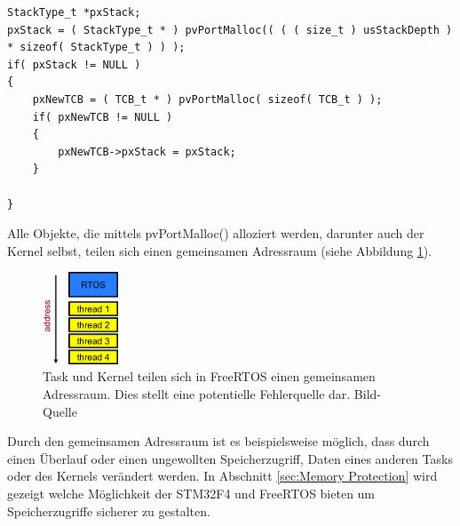 \begin{lstlisting}[caption={FreeRTOS Source von xTaskCreate() aus Task.c. Jeder Task besitzt einen Stack und einen Task Control Block, beide werden beim Aufruf von xTaskCreate (Zeile 2 und Zeile 6) erstellt.}, linewidth=8cm,captionpos=b, label=lst:xTaskCreate, float=htb]
StackType_t *pxStack;
pxStack = ( StackType_t * ) pvPortMalloc(( ( ( size_t ) usStackDepth ) 
* sizeof( StackType_t ) ) );
if( pxStack != NULL )
{
	pxNewTCB = ( TCB_t * ) pvPortMalloc( sizeof( TCB_t ) );
	if( pxNewTCB != NULL )
	{
		pxNewTCB->pxStack = pxStack;
	}

}
\end{lstlisting}
Alle Objekte, die mittels pvPortMalloc() alloziert werden, darunter auch der Kernel selbst, teilen sich einen gemeinsamen Adressraum (siehe Abbildung \ref{fig:AddressSpace}). 
\begin{figure}[hbt]
	\centering
		\includegraphics[width=0.2\textwidth]{Pictures/EmbeddedCom/addressSpace.jpg}
	\caption{Task und Kernel teilen sich in FreeRTOS einen gemeinsamen Adressraum. Dies stellt eine potentielle Fehlerquelle dar. Bild-Quelle~\protect{}}
	\label{fig:AddressSpace}
\end{figure} 
Durch den gemeinsamen Adressraum ist es beispielsweise mög\-lich, dass durch einen Überlauf oder einen ungewollten Speicherzugriff, Daten eines anderen Tasks oder des Kernels ver\-än\-dert werden.   
In Abschnitt \ref{sec:Memory Protection} wird gezeigt welche Mög\-lich\-keit der STM32F4 und FreeRTOS bieten um Speicherzugriffe sicherer zu gestalten.    
